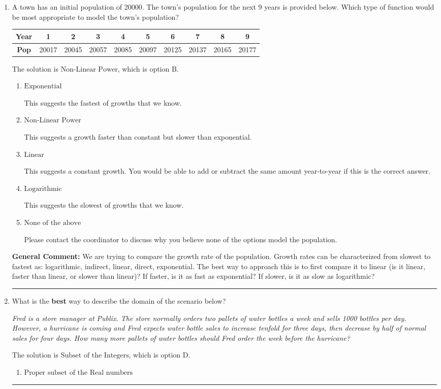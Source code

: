 \documentclass{extbook}[14pt]
\newcommand{\litem}[1]{\item #1

\rule{\textwidth}{0.4pt}}
\begin{document}
\begin{enumerate}\litem{
A town has an initial population of 20000. The town's population for the next 9 years is provided below. Which type of function would be most appropriate to model the town's population?


\begin{tabular}{c|c|c|c|c|c|c|c|c|c}
\textbf{Year} &1 &2 &3 &4 &5 &6 &7 &8 &9\tabularnewline \hline
\textbf{Pop} &20017 &20045 &20057 &20085 &20097 &20125 &20137 &20165 &20177\end{tabular}The solution is \( \text{Non-Linear Power} \), which is option B.\begin{enumerate}[label=\Alph*.]
\item \( \text{Exponential} \)

This suggests the fastest of growths that we know.
\item \( \text{Non-Linear Power} \)

This suggests a growth faster than constant but slower than exponential.
\item \( \text{Linear} \)

This suggests a constant growth. You would be able to add or subtract the same amount year-to-year if this is the correct answer.
\item \( \text{Logarithmic} \)

This suggests the slowest of growths that we know.
\item \( \text{None of the above} \)

Please contact the coordinator to discuss why you believe none of the options model the population.
\end{enumerate}

\textbf{General Comment:} We are trying to compare the growth rate of the population. Growth rates can be characterized from slowest to fastest as: logarithmic, indirect, linear, direct, exponential. The best way to approach this is to first compare it to linear (is it linear, faster than linear, or slower than linear)? If faster, is it as fast as exponential? If slower, is it as slow as logarithmic?
}
\litem{
What is the \textbf{best} way to describe the domain of the scenario below?

\begin{center}
    \textit{ Fred is a store manager at Publix. The store normally orders two pallets of water bottles a week and sells 1000 bottles per day. However, a hurricane is coming and Fred expects water bottle sales to increase tenfold for three days, then decrease by half of normal sales for four days. How many more pallets of water bottles should Fred order the week before the hurricane? }
\end{center}
The solution is \( \text{Subset of the Integers} \), which is option D.\begin{enumerate}[label=\Alph*.]
\item \( \text{Proper subset of the Real numbers} \)


\end{enumerate}}
\end{enumerate}
\end{document}

